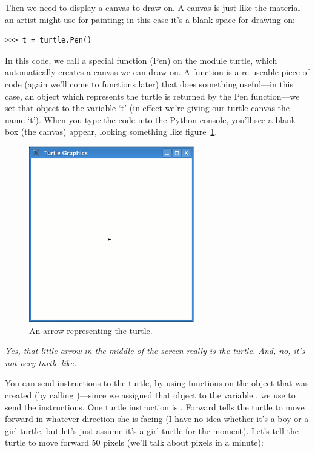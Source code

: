 Then we need to display a canvas to draw on.  A canvas is just like the material an artist might use for painting; in this case it's a blank space for drawing on:

\begin{listing}
\begin{verbatim}
>>> t = turtle.Pen()
\end{verbatim}
\end{listing}

In this code, we call a special function (Pen) on the module turtle, which automatically creates a canvas we can draw on.  A function is a re-useable piece of code (again we'll come to functions later) that does something useful---in this case, an object which represents the turtle is returned by the Pen function---we set that object to the variable `t' (in effect we're giving our turtle canvas the name `t'). When you type the code into the Python console, you'll see a blank box (the canvas) appear, looking something like figure~\ref{fig10}.

\begin{figure}
\begin{center}
\includegraphics[width=72mm]{figure10.eps}
\end{center}
\caption{An arrow representing the turtle.}\label{fig10}
\end{figure}

\emph{Yes, that little arrow in the middle of the screen really is the turtle.  And, no, it's not very turtle-like.}

You can send instructions to the turtle, by using functions on the object that was created (by calling )---since we assigned that object to the variable , we use  to send the instructions.
One turtle instruction is .  Forward tells the turtle to move forward in whatever direction she is facing (I have no idea whether it's a boy or a girl turtle, but let's just assume it's a girl-turtle for the moment). Let's tell the turtle to move forward 50 pixels (we'll talk about pixels in a minute):

